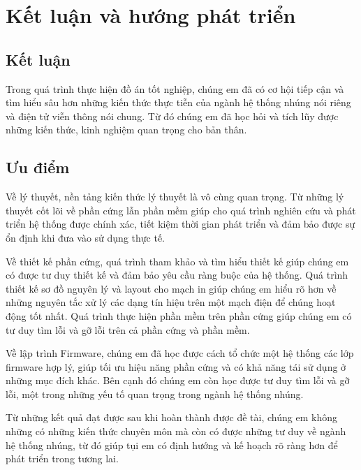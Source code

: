 ﻿%

\chapter{Kết luận và hướng phát triển}
\label{ch:ket-luan-huong-phat-trien}

\section{Kết luận}
\label{sec:ket-luan}

Trong quá trình thực hiện đồ án tốt nghiệp, chúng em đã có cơ hội tiếp cận và tìm hiểu sâu hơn những kiến thức thực tiễn của ngành hệ thống nhúng nói riêng và điện tử viễn thông nói chung. Từ đó chúng em đã học hỏi và tích lũy được những kiến thức, kinh nghiệm quan trọng cho bản thân.

\section{Ưu điểm}
\label{sec:uu-diem}

Về lý thuyết, nền tảng kiến thức lý thuyết là vô cùng quan trọng. Từ những lý thuyết cốt lõi về phần cứng lẫn phần mềm giúp cho quá trình nghiên cứu và phát triển hệ thống được chính xác, tiết kiệm thời gian phát triển và đảm bảo được sự ổn định khi đưa vào sử dụng thực tế.

Về thiết kế phần cứng, quá trình tham khảo và tìm hiểu thiết kế giúp chúng em có được tư duy thiết kế và đảm bảo yêu cầu ràng buộc của hệ thống. Quá trình thiết kế sơ đồ nguyên lý và layout cho mạch in giúp chúng em hiểu rõ hơn về những nguyên tắc xử lý các dạng tín hiệu trên một mạch điện để chúng hoạt động tốt nhất. Quá trình thực hiện phần mềm trên phần cứng giúp chúng em có tư duy tìm lỗi và gỡ lỗi trên cả phần cứng và phần mềm.

Về lập trình Firmware, chúng em đã học được cách tổ chức một hệ thống các lớp firmware hợp lý, giúp tối ưu hiệu năng phần cứng và có khả năng tái sử dụng ở những mục đích khác. Bên cạnh đó chúng em còn học được tư duy tìm lỗi và gỡ lỗi, một trong những yếu tố quan trọng trong ngành hệ thống nhúng.

Từ những kết quả đạt được sau khi hoàn thành được đề tài, chúng em không những có những kiến thức chuyên môn mà còn có được những tư duy về ngành hệ thống nhúng, từ đó giúp tụi em có định hướng và kế hoạch rõ ràng hơn để phát triển trong tương lai.
